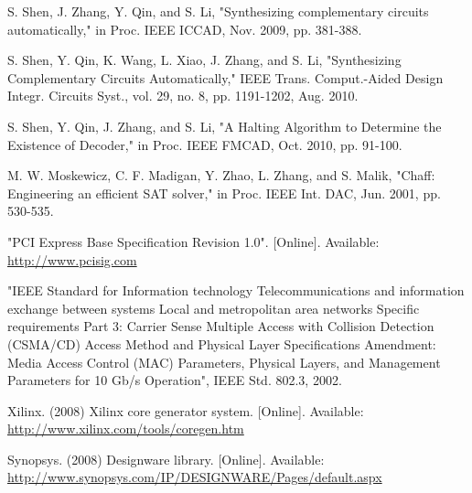 \documentclass[journal]{IEEEtran}
\begin{document}
%
%
%
\begin{thebibliography}{1}

S. Shen, J. Zhang, Y. Qin, and S. Li,
"Synthesizing complementary circuits automatically,"
in Proc. IEEE ICCAD, Nov. 2009, pp. 381-388.

S. Shen, Y. Qin, K. Wang, L. Xiao, J. Zhang, and S. Li,
"Synthesizing Complementary Circuits Automatically,"
IEEE Trans. Comput.-Aided Design Integr. Circuits Syst.,
vol. 29, no. 8, pp. 1191-1202, Aug. 2010.


S. Shen, Y. Qin, J. Zhang, and S. Li,
"A Halting Algorithm to Determine the Existence of Decoder,"
in Proc. IEEE FMCAD, Oct. 2010, pp. 91-100.

M. W. Moskewicz, C. F. Madigan, Y. Zhao, L. Zhang, and S. Malik,
"Chaff: Engineering an efficient SAT solver," in Proc. IEEE Int. DAC,
Jun. 2001, pp. 530-535.


"PCI Express Base Specification Revision 1.0". [Online]. Available:
  \url{http://www.pcisig.com}

"IEEE Standard for Information technology Telecommunications and
  information exchange between systems Local and metropolitan area networks
  Specific requirements Part 3: Carrier Sense Multiple Access with Collision
  Detection (CSMA/CD) Access Method and Physical Layer Specifications
  Amendment: Media Access Control (MAC) Parameters, Physical Layers, and
  Management Parameters for 10 Gb/s Operation", IEEE Std. 802.3, 2002.

Xilinx. (2008) Xilinx core generator system. [Online]. Available:
  \url{http://www.xilinx.com/tools/coregen.htm}


Synopsys. (2008) Designware library. [Online]. Available:
  \url{http://www.synopsys.com/IP/DESIGNWARE/Pages/default.aspx}



\end{thebibliography}
\end{document}
